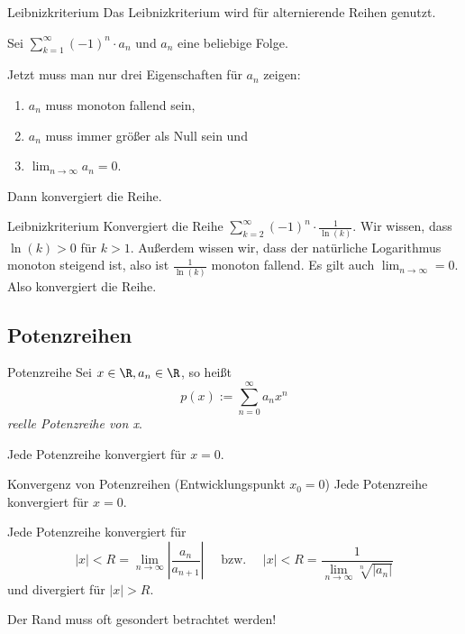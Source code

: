 \documentclass[german]{../spicker}
\renewcommand{\abs}[1]{\left| #1 \right|}
\begin{document}
\begin{algo}{Leibnizkriterium}
    Das Leibnizkriterium wird für alternierende Reihen genutzt.

    Sei $\sum_{k=1}^{\infty} (-1)^n \cdot a_n$ und $a_n$ eine beliebige Folge.

    Jetzt muss man nur drei Eigenschaften für $a_n$ zeigen:
    \begin{enumerate}
        \item $a_n$ muss monoton fallend sein,
        \item $a_n$ muss immer größer als Null sein und
        \item $\lim_{n\to\infty} a_n =0$.
    \end{enumerate}

    Dann konvergiert die Reihe.
\end{algo}

\begin{example}{Leibnizkriterium}
    Konvergiert die Reihe $\sum_{k=2}^{\infty} (-1)^n \cdot \frac{1}{\ln(k)}$.
    Wir wissen, dass $\ln(k) > 0$ für $k>1$.
    Außerdem wissen wir, dass der natürliche Logarithmus monoton steigend ist, also ist $\frac{1}{\ln(k)}$ monoton fallend.
    Es gilt auch $\lim_{n\to\infty} = 0$. Also konvergiert die Reihe.
\end{example}


\subsection{Potenzreihen}

\begin{defi}{Potenzreihe}
    Sei $x \in \R, a_n \in \R$, so heißt
    $$
        p(x) := \sum_{n=0}^{\infty} a_nx^n
    $$
    \emph{reelle Potenzreihe von x}.

    Jede Potenzreihe konvergiert für $x=0$.
\end{defi}

\begin{defi}{Konvergenz von Potenzreihen (Entwicklungspunkt $x_0 = 0$)}
    Jede Potenzreihe konvergiert für $x=0$.

    Jede Potenzreihe konvergiert für
    $$
        \abs{x} < R = \lim_{n\to\infty} \abs{\frac{a_n}{a_{n+1}}} \quad \text{ bzw. } \quad \abs{x} < R = \frac{1}{\lim_{n\to\infty} \sqrt[n]{\abs{a_n}}}
    $$
    und divergiert für $\abs{x} > R$.

    Der Rand muss oft gesondert betrachtet werden!
\end{defi}
\end{document}
